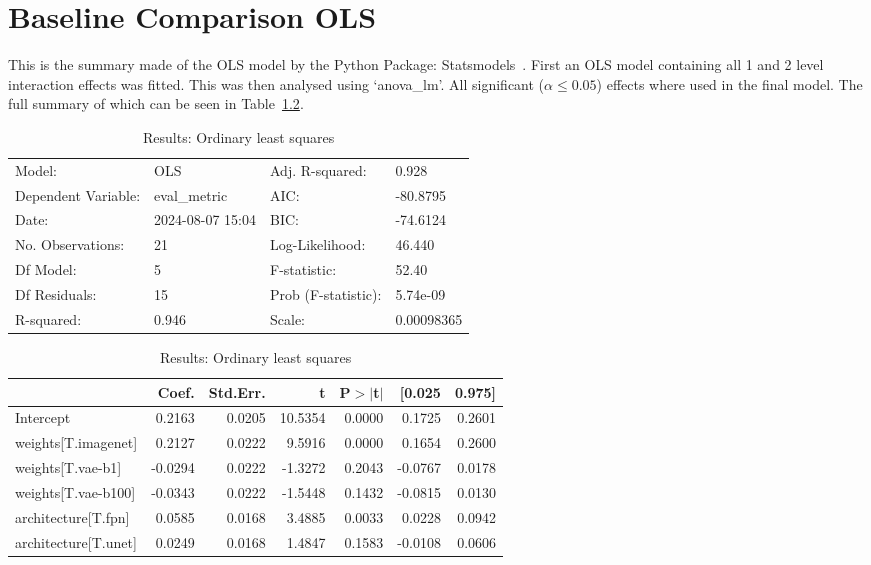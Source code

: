 \chapter{Baseline Comparison OLS}
\label{appendix:baselines_comparison_full}
This is the summary made of the OLS model by the Python Package: Statsmodels~\cite{josef_perktold_2024_10984387}. First an OLS model containing all 1 and 2 level interaction effects was fitted. This was then analysed using `anova\_lm'. All significant ($\alpha\le0.05$) effects where used in the final model. The full summary of which can be seen in Table~\ref{tab:comparison_baselines_full_ols}.

\begin{table}[ht]
\caption{Results: Ordinary least squares}
\label{tab:comparison_baselines_full_ols}
\begin{center}
\begin{tabular}{llll}
\hline
Model:              & OLS              & Adj. R-squared:     & 0.928       \\
Dependent Variable: & eval\_metric     & AIC:                & -80.8795    \\
Date:               & 2024-08-07 15:04 & BIC:                & -74.6124    \\
No. Observations:   & 21               & Log-Likelihood:     & 46.440      \\
Df Model:           & 5                & F-statistic:        & 52.40       \\
Df Residuals:       & 15               & Prob (F-statistic): & 5.74e-09    \\
R-squared:          & 0.946            & Scale:              & 0.00098365  \\
\hline
\end{tabular}
\end{center}

\begin{center}
\begin{tabular}{lrrrrrr}
\hline
                     &   Coef. & Std.Err. &       t & P$> |$t$|$ &  [0.025 & 0.975]  \\
\hline
Intercept            &  0.2163 &   0.0205 & 10.5354 &      0.0000 &  0.1725 & 0.2601  \\
weights[T.imagenet]  &  0.2127 &   0.0222 &  9.5916 &      0.0000 &  0.1654 & 0.2600  \\
weights[T.vae-b1]    & -0.0294 &   0.0222 & -1.3272 &      0.2043 & -0.0767 & 0.0178  \\
weights[T.vae-b100]  & -0.0343 &   0.0222 & -1.5448 &      0.1432 & -0.0815 & 0.0130  \\
architecture[T.fpn]  &  0.0585 &   0.0168 &  3.4885 &      0.0033 &  0.0228 & 0.0942  \\
architecture[T.unet] &  0.0249 &   0.0168 &  1.4847 &      0.1583 & -0.0108 & 0.0606  \\
\hline
\end{tabular}
\end{center}


\end{table}
